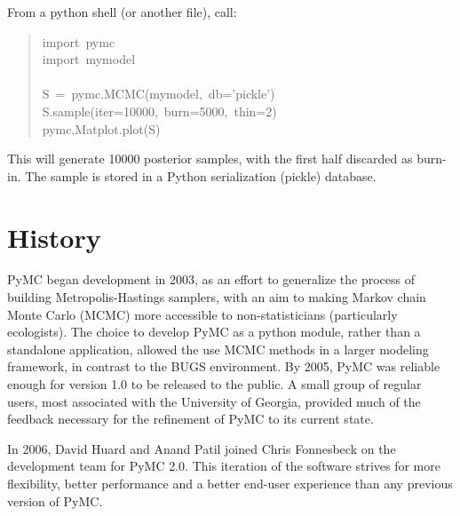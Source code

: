 From a python shell (or another file), call:
\begin{quote}{\ttfamily \raggedright \noindent
import~pymc~\\
import~mymodel~\\
~\\
S~=~pymc.MCMC(mymodel,~db='pickle')~\\
S.sample(iter=10000,~burn=5000,~thin=2)~\\
pymc.Matplot.plot(S)
}\end{quote}

This will generate 10000 posterior samples, with the first half discarded as burn-in. The sample is stored in a Python serialization (pickle) database.



\hypertarget{history}{}
\section*{History}
\label{history}

PyMC began development in 2003, as an effort to generalize the process of building Metropolis-Hastings samplers, with an aim to making Markov chain Monte Carlo (MCMC) more accessible to non-statisticians (particularly ecologists). The choice to develop PyMC as a python module, rather than a standalone application, allowed the use MCMC methods in a larger modeling framework, in contrast to the BUGS environment. By 2005, PyMC was reliable enough for version 1.0 to be released to the public. A small group of regular users, most associated with the University of Georgia, provided much of the feedback necessary for the refinement of PyMC to its current state.

In 2006, David Huard and Anand Patil joined Chris Fonnesbeck on the development team for PyMC 2.0. This iteration of the software strives for more flexibility, better performance and a better end-user experience than any previous version of PyMC.



